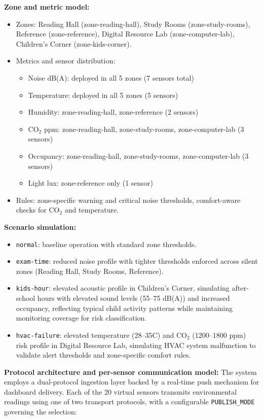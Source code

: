 \documentclass[12pt,a4paper]{article}
\begin{document}
\textbf{Zone and metric model:}
\begin{itemize}[leftmargin=1.5em]
	\item Zones: Reading Hall (zone-reading-hall), Study Rooms (zone-study-rooms), Reference (zone-reference), Digital Resource Lab (zone-computer-lab), Children's Corner (zone-kids-corner).
	\item Metrics and sensor distribution:
	      \begin{itemize}[leftmargin=1.5em]
		      \item Noise dB(A): deployed in all 5 zones (7 sensors total)
		      \item Temperature: deployed in all 5 zones (5 sensors)
		      \item Humidity: zone-reading-hall, zone-reference (2 sensors)
		      \item CO$_2$ ppm: zone-reading-hall, zone-study-rooms, zone-computer-lab (3 sensors)
		      \item Occupancy: zone-reading-hall, zone-study-rooms, zone-computer-lab (3 sensors)
		      \item Light lux: zone-reference only (1 sensor)
	      \end{itemize}
	\item Rules: zone-specific warning and critical noise thresholds, comfort-aware checks for CO$_2$ and temperature.
\end{itemize}

\textbf{Scenario simulation:}
\begin{itemize}[leftmargin=1.5em]
	\item \texttt{normal}: baseline operation with standard zone thresholds.
	\item \texttt{exam-time}: reduced noise profile with tighter thresholds enforced across silent zones (Reading Hall, Study Rooms, Reference).
	\item \texttt{kids-hour}: elevated acoustic profile in Children's Corner, simulating after-school hours with elevated sound levels (55--75 dB(A)) and increased occupancy, reflecting typical child activity patterns while maintaining monitoring coverage for risk classification.
	\item \texttt{hvac-failure}: elevated temperature (28--35\textdegree{}C) and CO$_2$ (1200--1800 ppm) risk profile in Digital Resource Lab, simulating HVAC system malfunction to validate alert thresholds and zone-specific comfort rules.
\end{itemize}

\textbf{Protocol architecture and per-sensor communication model:}
The system employs a dual-protocol ingestion layer backed by a real-time push mechanism for dashboard delivery. Each of the 20 virtual sensors transmits environmental readings using one of two transport protocols, with a configurable \texttt{PUBLISH\_MODE} governing the selection:
\end{document}
